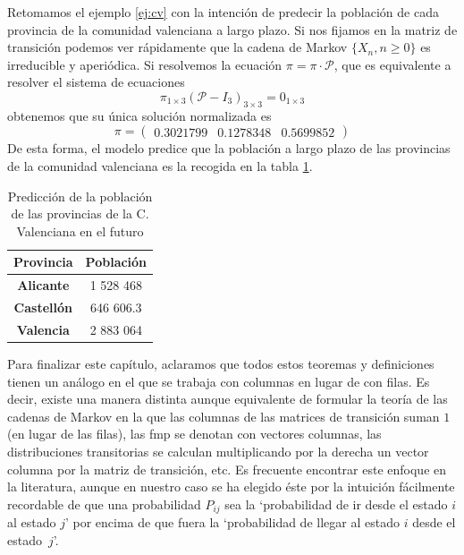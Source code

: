 \begin{ejemplo}
    \label{ej:cv2}
    Retomamos el ejemplo \ref{ej:cv} con la intención de predecir la población de cada provincia de la comunidad valenciana a largo plazo. Si nos fijamos en la matriz de transición podemos ver rápidamente que la cadena de Markov $\{X_n,n\geq 0\}$ es irreducible y aperiódica. Si resolvemos la ecuación $\pi=\pi \cdot \mathcal P$, que es equivalente a resolver el sistema de ecuaciones 
    \begin{equation*}
        \pi_{1\times 3} (\mathcal P-I_3)_{3\times 3} = 0_{1\times 3} 
    \end{equation*}
    obtenemos que su única solución normalizada es 
    \begin{equation*}
        \pi = \begin{pmatrix}
            0.3021799 & 0.1278348 & 0.5699852
        \end{pmatrix}
    \end{equation*}
    De esta forma, el modelo predice que la población a largo plazo de las provincias de la comunidad valenciana es la recogida en la tabla \ref{tab:poblacion-largo-plazo}.
    \begin{table}[h]
        \centering
        \begin{tabular}{cc}\hline
            \textbf{Provincia}  & \textbf{Población} \\ \hline\hline
            \textbf{Alicante} &  1 528 468 \\ \hline
            \textbf{Castellón} & 646 606.3 \\ \hline
            \textbf{Valencia} & 2 883 064 \\ \hline
        \end{tabular}
        \caption{Predicción de la población de las provincias de la C. Valenciana en el futuro}
        \label{tab:poblacion-largo-plazo}
    \end{table}
\end{ejemplo}

Para finalizar este capítulo, aclaramos que todos estos teoremas y definiciones tienen un análogo en el que se trabaja con columnas en lugar de con filas. Es decir, existe una manera distinta aunque equivalente de formular la teoría de las cadenas de Markov en la que las columnas de las matrices de transición suman $1$ (en lugar de las filas), las fmp se denotan con vectores columnas, las distribuciones transitorias se calculan multiplicando por la derecha un vector columna por la matriz de transición, etc. Es frecuente encontrar este enfoque en la literatura, aunque en nuestro caso se ha elegido éste por la intuición fácilmente recordable de que una probabilidad $P_{ij}$ sea la `probabilidad de ir desde el estado $i$ al estado $j$' por encima de que fuera la `probabilidad de llegar al estado $i$ desde el estado~$j$'. 